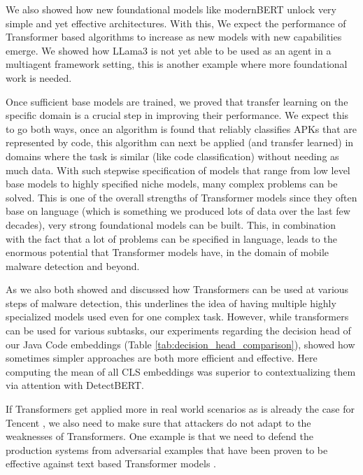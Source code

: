 We also showed how new foundational models like modernBERT unlock very simple and yet 
effective architectures. 
With this, We expect the performance of Transformer based algorithms to increase as 
new models with new capabilities emerge. 
We showed how LLama3 \cite{llama3modelcard} is not yet able to be used as an agent 
in a multiagent framework setting, this is another example where more foundational work is needed.

Once sufficient base models are trained, we proved that transfer learning on the specific domain 
is a crucial step in improving their performance.
We expect this to go both ways, once an algorithm is found that reliably classifies APKs that are 
represented by code, this algorithm can next be applied (and transfer learned) in domains
where the task is similar (like code classification) without needing as much data.
With such stepwise specification of models that range from low level base models to
highly specified niche models, many complex problems can be solved.
This is one of the overall strengths of Transformer models since they often base on language (which
is something we produced lots of data over the last few decades), very strong foundational models
can be built. This, in combination with the fact that a lot of problems can be specified in language,
leads to the enormous potential that Transformer models have, in the domain of mobile malware detection
and beyond.

As we also both showed and discussed how Transformers can be used at various steps
of malware detection, this underlines the idea of having multiple highly specialized models used
even for one complex task.
However, while transformers can be used for various subtasks, our experiments regarding the decision
head of our Java Code embeddings (Table \ref{tab:decision_head_comparison}), 
showed how sometimes simpler approaches are both more efficient and effective. 
Here computing the mean of all CLS embeddings was superior to contextualizing them
via attention with DetectBERT.

If Transformers get applied more in real world scenarios as is already the case for
Tencent \cite{htgt}, we also need to make sure that attackers do not adapt to the weaknesses of
Transformers.
One example is that we need to defend the production systems from adversarial examples that have
been proven to be effective against text based Transformer models \cite{adversarial_transformer}.

